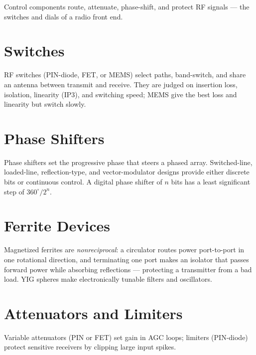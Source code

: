 Control components route, attenuate, phase-shift, and protect RF signals --- the
switches and dials of a radio front end.

\section{Switches}
RF switches (PIN-diode, FET, or MEMS) select paths, band-switch, and share an
antenna between transmit and receive. They are judged on insertion loss,
isolation, linearity (IP3), and switching speed; MEMS give the best loss and
linearity but switch slowly.

\section{Phase Shifters}
Phase shifters set the progressive phase that steers a phased array. Switched-line,
loaded-line, reflection-type, and vector-modulator designs provide either discrete
bits or continuous control. A digital phase shifter of $n$ bits has a least
significant step of $360^\circ/2^n$.

\section{Ferrite Devices}
Magnetized ferrites are \emph{nonreciprocal}: a circulator routes power
port-to-port in one rotational direction, and terminating one port makes an
isolator that passes forward power while absorbing reflections --- protecting a
transmitter from a bad load. YIG spheres make electronically tunable filters and
oscillators.

\section{Attenuators and Limiters}
Variable attenuators (PIN or FET) set gain in AGC loops; limiters (PIN-diode)
protect sensitive receivers by clipping large input spikes.
